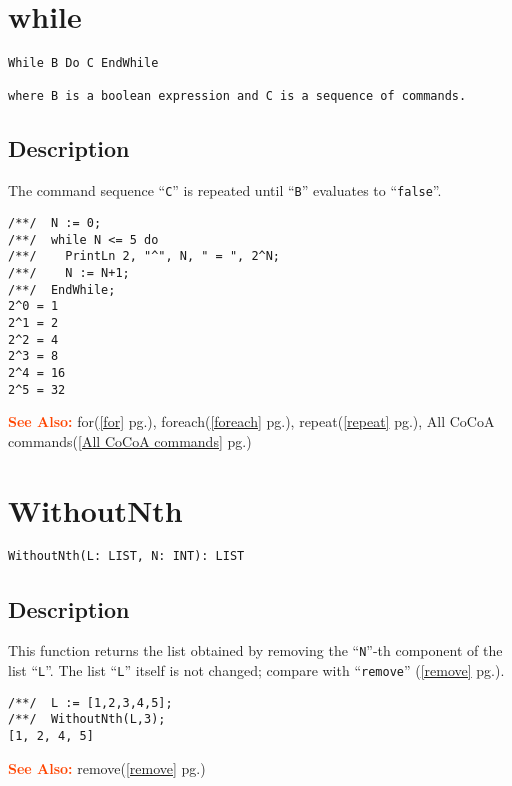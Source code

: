 \documentclass[a4paper]{mybook}
\newenvironment{command}{}{} %
\newcommand\SeeAlso{\par\textcolor{OrangeRed}{\textbf{\large See Also: }}}
\begin{document}
\section{while}
\label{while}
\begin{command} %


\begin{Verbatim}[label=syntax, rulecolor=\color{MidnightBlue},
frame=single]
While B Do C EndWhile

where B is a boolean expression and C is a sequence of commands.
\end{Verbatim}


\subsection*{Description}

The command sequence ``\verb&C&'' is repeated until ``\verb&B&'' evaluates to ``\verb&false&''.
\begin{Verbatim}[label=example, rulecolor=\color{PineGreen}, frame=single]
/**/  N := 0;
/**/  while N <= 5 do
/**/    PrintLn 2, "^", N, " = ", 2^N;
/**/    N := N+1;
/**/  EndWhile;
2^0 = 1
2^1 = 2
2^2 = 4
2^3 = 8
2^4 = 16
2^5 = 32
\end{Verbatim}


\SeeAlso %
  for(\ref{for} pg.\pageref{for}), 
    foreach(\ref{foreach} pg.\pageref{foreach}), 
    repeat(\ref{repeat} pg.\pageref{repeat}), 
    All CoCoA commands(\ref{All CoCoA commands} pg.\pageref{All CoCoA commands})
\end{command} %

\section{WithoutNth}
\label{WithoutNth}
\begin{command} %


\begin{Verbatim}[label=syntax, rulecolor=\color{MidnightBlue},
frame=single]
WithoutNth(L: LIST, N: INT): LIST
\end{Verbatim}


\subsection*{Description}

This function returns the list obtained by removing the ``\verb&N&''-th component
of the list ``\verb&L&''.  The list ``\verb&L&'' itself is not changed; compare with
``\verb&remove&'' (\ref{remove} pg.\pageref{remove}).
\begin{Verbatim}[label=example, rulecolor=\color{PineGreen}, frame=single]
/**/  L := [1,2,3,4,5];
/**/  WithoutNth(L,3);
[1, 2, 4, 5]
\end{Verbatim}


\SeeAlso %
  remove(\ref{remove} pg.\pageref{remove})
\end{command} %
\end{document}
